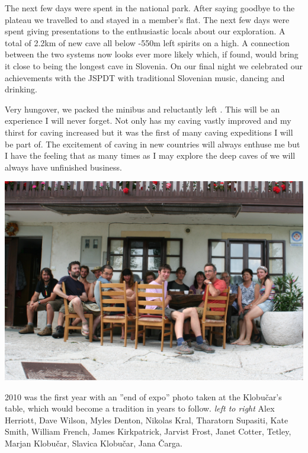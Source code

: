 The next few days were spent  in the
national park. After saying goodbye to the plateau we travelled to  and stayed in a member's
flat. The next few days were spent giving presentations to the enthusiastic locals about our exploration. A total of 2.2km of new cave all below -550m left spirits on a high. A connection between the two
systems now looks ever more likely which, if found, would bring it close to being the longest cave in
Slovenia. On our final night we celebrated our achievements with the JSPDT with traditional Slovenian
music, dancing and drinking.



Very hungover, we packed the minibus and reluctantly left . This will be an experience I
will never forget. Not only has my caving vastly improved and my thirst for caving increased but it
was the first of many caving expeditions I will be part of. The excitement of caving in new countries
will always enthuse me but I have the feeling that as many times as I may explore the deep caves of
 we will always have unfinished business.




\begin{pagefigure}
\checkoddpage \ifoddpage \forcerectofloat \else \forceversofloat \fi
   \centering
\includegraphics[width = \textwidth]{2010/ap_awards/20100813-14-58-03 - Jana Carga 64--crop-orig.jpg}
\caption{2010 was the first year with an ''end of expo'' photo taken at the Klobučar's table, which would become a tradition in years to follow. \textit{left to right} Alex Herriott, Dave Wilson, Myles Denton, Nikolas Kral, Tharatorn Supasiti, Kate Smith, William French, James Kirkpatrick, Jarvist Frost, Janet Cotter, Tetley, Marjan Klobučar, Slavica Klobučar, Jana Čarga. } \label{Klobučar 2010}
\end{pagefigure}
